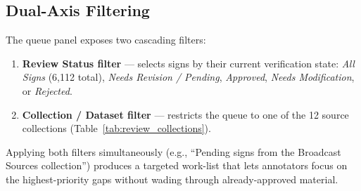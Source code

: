\subsection{Dual-Axis Filtering}

The queue panel exposes two cascading filters:
\begin{enumerate}[leftmargin=*,itemsep=2pt]
  \item \textbf{Review Status filter} --- selects signs by their current verification state:
    \emph{All Signs} (6,112 total),
    \emph{Needs Revision / Pending},
    \emph{Approved},
    \emph{Needs Modification}, or
    \emph{Rejected}.
  \item \textbf{Collection / Dataset filter} --- restricts the queue to one of the 12 source
    collections (Table~\ref{tab:review_collections}).
\end{enumerate}
Applying both filters simultaneously (e.g., ``Pending signs from the Broadcast Sources collection'')
produces a targeted work-list that lets annotators focus on the highest-priority gaps without
wading through already-approved material.

